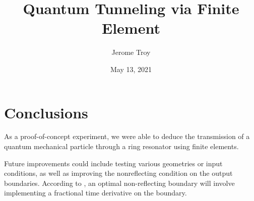 \documentclass{article}
\title{Quantum Tunneling via Finite Element}
\author{Jerome Troy}
\date{ May 13, 2021}
\begin{document}
\maketitle



\newpage 





\section{Conclusions}

As a proof-of-concept experiment,
we were able to deduce the transmission of
a quantum mechanical particle through a 
ring resonator using finite elements.  

Future improvements could include
testing various geometries or input 
conditions, as well as improving the 
nonreflecting condition on the output boundaries.
According to \cite{better-boundary}, 
an optimal non-reflecting boundary will involve 
implementing a fractional time 
derivative on the boundary.



\nocite{*}



\appendix


\end{document}
